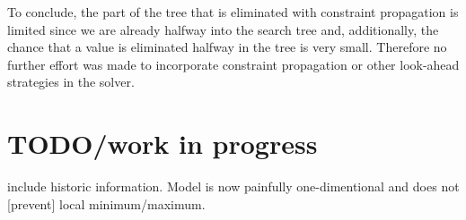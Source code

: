 To conclude, the part of the tree that is eliminated with constraint propagation is limited since we are already halfway into the search tree and, additionally, the chance that a value is eliminated halfway in the tree is very small. Therefore no further effort was made to incorporate constraint propagation or other look-ahead strategies in the solver.

\section*{TODO/work in progress}
include historic information. Model is now painfully one-dimentional and does not [prevent] local minimum/maximum.
	









